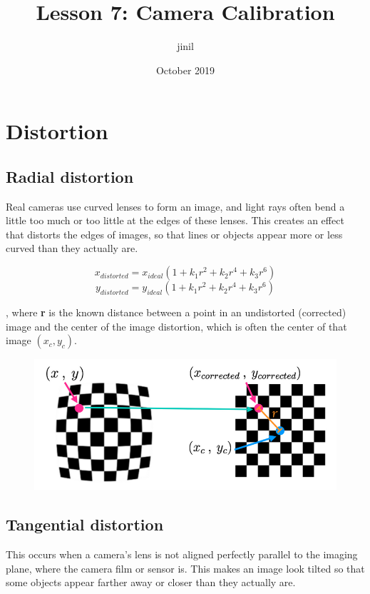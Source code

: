 \documentclass[12pt]{article}
\title{Lesson 7: Camera Calibration}
\author{jinil }
\date{October 2019}
\begin{document}
\maketitle

\section{Distortion}

\subsection{Radial distortion}

Real cameras use curved lenses to form an image, and light rays often bend a little too much or too little at the edges of these lenses. This creates an effect that distorts the edges of images, so that lines or objects appear more or less curved than they actually are.

\[x_{distorted} = x_{ideal}(1 + k_1r^2 + k_2r^4 + k_3r^6)\]
\[y_{distorted} = y_{ideal}(1 + k_1r^2 + k_2r^4 + k_3r^6)\]

, where \textbf{r} is the known distance between a point in an undistorted (corrected) image and the center of the image distortion, which is often the center of that image $(x_c, y_c)$.

\begin{figure}[htp]
    \centering
    \includegraphics[width=15cm]{distortion.png}
    \label{fig:distortion}
\end{figure}

\subsection{Tangential distortion}

This occurs when a camera’s lens is not aligned perfectly parallel to the imaging plane, where the camera film or sensor is. This makes an image look tilted so that some objects appear farther away or closer than they actually are.
\end{document}
